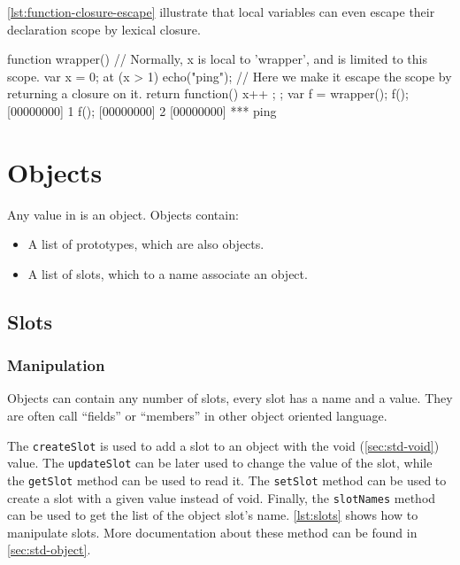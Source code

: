 \autoref{lst:function-closure-escape} illustrate that local variables can even
escape their declaration scope by lexical closure.

\begin{urbiscript}[caption=Local variable escaping its scope by
  lexical closure.,label=lst:function-closure-escape,float=\floatpos]
  function wrapper()
  {
    // Normally, x is local to 'wrapper', and is limited to this scope.
    var x = 0;
    at (x > 1)
      echo("ping");
    // Here we make it escape the scope by returning a closure on it.
    return function() { x++ };
  };
  var f = wrapper();
  f();
  [00000000] 1
  f();
  [00000000] 2
  [00000000] *** ping
\end{urbiscript}

\FloatBarrier
\section{Objects}

Any value in \us is an object. Objects contain:

\begin{itemize}
\item A list of prototypes, which are also objects.
\item A list of slots, which to a name associate an object.
\end{itemize}

\subsection{Slots}

\subsubsection{Manipulation}

Objects can contain any number of slots, every slot has a name and a
value. They are often call ``fields'' or ``members'' in other object
oriented language.

The \lstinline|createSlot| is used to add a slot to an object with the
void (\autoref{sec:std-void}) value. The \lstinline|updateSlot| can be later
used to change the value of the slot, while the \lstinline|getSlot|
method can be used to read it. The \lstinline|setSlot| method can be
used to create a slot with a given value instead of void. Finally, the
\lstinline|slotNames| method can be used to get the list of the object
slot's name. \autoref{lst:slots} shows how to manipulate slots. More
documentation about these method can be found in \autoref{sec:std-object}.

